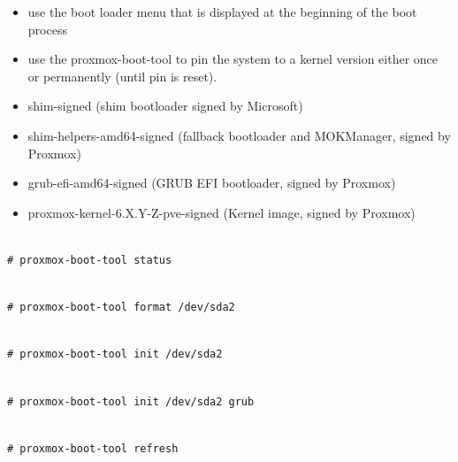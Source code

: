 \begin{itemize}[leftmargin=2cm]

	\item use the boot loader menu that is displayed at the beginning of the boot process

	\item use the proxmox-boot-tool to pin the system to a kernel version either once or permanently (until pin is reset).

\end{itemize}

\begin{itemize}[leftmargin=2cm]

	\item shim-signed (shim bootloader signed by Microsoft)

	\item shim-helpers-amd64-signed (fallback bootloader and MOKManager, signed by Proxmox)

	\item grub-efi-amd64-signed (GRUB EFI bootloader, signed by Proxmox)

	\item proxmox-kernel-6.X.Y-Z-pve-signed (Kernel image, signed by Proxmox)

\end{itemize}

\begin{lstlisting}

# proxmox-boot-tool status

\end{lstlisting}

\begin{lstlisting}

# proxmox-boot-tool format /dev/sda2

\end{lstlisting}

\begin{lstlisting}

# proxmox-boot-tool init /dev/sda2

\end{lstlisting}

\begin{lstlisting}

# proxmox-boot-tool init /dev/sda2 grub

\end{lstlisting}

\begin{lstlisting}

# proxmox-boot-tool refresh

\end{lstlisting}

